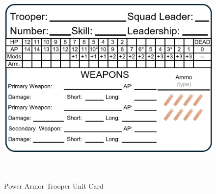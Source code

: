 \begin{figure}[H]
  \centering
  \includegraphics[alt='Sample Power Armor Trooper', width=5.63in, height=4in]{img/PowerArmorTrooper.png}
  \caption*{Power Armor Trooper Unit Card}
\end{figure}

